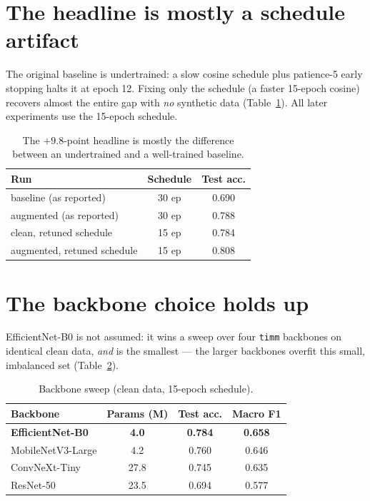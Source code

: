 \documentclass[a4paper]{article}
\begin{document}
\section{The headline is mostly a schedule artifact}
The original baseline is undertrained: a slow cosine schedule plus patience-5
early stopping halts it at epoch 12. Fixing only the schedule (a faster 15-epoch
cosine) recovers almost the entire gap with \emph{no} synthetic data
(Table~\ref{tab:schedule}). All later experiments use the 15-epoch schedule.

\begin{table}[h]\centering
\begin{tabular}{lcc}
\toprule
Run & Schedule & Test acc.\\
\midrule
baseline (as reported)      & 30 ep & 0.690\\
augmented (as reported)     & 30 ep & 0.788\\
clean, retuned schedule     & 15 ep & 0.784\\
augmented, retuned schedule & 15 ep & 0.808\\
\bottomrule
\end{tabular}
\caption{The $+9.8$-point headline is mostly the difference between an
undertrained and a well-trained baseline.}
\label{tab:schedule}
\end{table}

\section{The backbone choice holds up}
EfficientNet-B0 is not assumed: it wins a sweep over four \texttt{timm} backbones
on identical clean data, \emph{and} is the smallest --- the larger backbones
overfit this small, imbalanced set (Table~\ref{tab:backbone}).

\begin{table}[h]\centering
\begin{tabular}{lccc}
\toprule
Backbone & Params (M) & Test acc. & Macro F1\\
\midrule
\textbf{EfficientNet-B0} & \textbf{4.0} & \textbf{0.784} & \textbf{0.658}\\
MobileNetV3-Large        & 4.2  & 0.760 & 0.646\\
ConvNeXt-Tiny            & 27.8 & 0.745 & 0.635\\
ResNet-50                & 23.5 & 0.694 & 0.577\\
\bottomrule
\end{tabular}
\caption{Backbone sweep (clean data, 15-epoch schedule).}
\label{tab:backbone}
\end{table}
\end{document}
